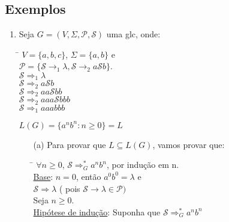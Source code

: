 \documentclass{article}
\begin{document}
\subsection{Exemplos}

\begin{enumerate}
    \item Seja $ G = ( V, \Sigma, \mathcal{P}, \mathcal{S} ) $ uma glc, onde:
        \begin{tabbing}
            \hspace{0.5cm}\= $ V = \{a,b,c\} $, $ \Sigma = \{a,b\} $ e\\
                        \> $ \mathcal{P} = \{ \mathcal{S} \rightarrow_1 \lambda, 
                                \mathcal{S} \rightarrow_2 a\mathcal{S}b \} $.\\[5pt]
                        \> $ \mathcal{S} \Rightarrow_1 \lambda $\\
                        \> $ \mathcal{S} \Rightarrow_2 a\mathcal{S}b $\\
                        \> $ \mathcal{S} \Rightarrow_2 aa\mathcal{S}bb $ \\
                        \> $ \mathcal{S} \Rightarrow_2 aaa\mathcal{S}bbb $ \\
                        \> $ \mathcal{S} \Rightarrow_1 aaabbb $ \\
        \end{tabbing}
        $ L(G) = \{a^nb^n : n \geq 0 \} = L$
        \begin{itemize}
            \item[(a)] Para provar que $ L \subseteq L(G) $, vamos provar que:
                \begin{tabbing}
                    \hspace{0.5cm}\= $ \forall n \geq 0 $, $ \mathcal{S} \Rightarrow_G^* a^nb^n $, 
                                        por indução em n.\\[5pt]
                                \> \underline{Base}: $n = 0$, então $ a^0b^0 = \lambda $ e\\
                                \> $ \mathcal{S} \Rightarrow \lambda $ ( pois $ \mathcal{S} \rightarrow 
                                            \lambda \in \mathcal{P} ) $\\[5pt]
                                \> Seja $ n \geq 0 $.\\[5pt]
                                \> \underline{Hipótese de indução}: Suponha que $ \mathcal{S} 
                                        \Rightarrow_G^* a^nb^n $\\[5pt]

\end{tabbing}
\end{itemize}
\end{enumerate}
\end{document}
